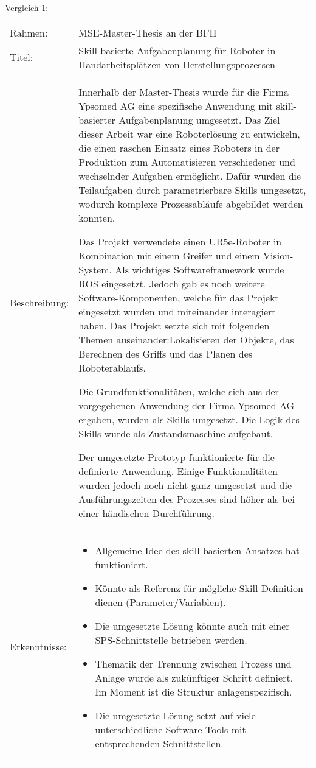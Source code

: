 	Vergleich  1:
	\vspace{2mm}
	\\
	\begin{tabularx}{\textwidth}{@{}>{}p{8em} X@{}}
		Rahmen: & 
		MSE-Master-Thesis an der BFH
		\\
		
		Titel: & 
		Skill-basierte Aufgabenplanung für Roboter in Handarbeitsplätzen von Herstellungsprozessen \cite{Vergleich_1} 
		\\
		
		Beschreibung: & 
		Innerhalb der Master-Thesis wurde für die Firma Ypsomed AG eine spezifische Anwendung mit skill-basierter Aufgabenplanung umgesetzt. Das Ziel dieser Arbeit war eine Roboterlösung zu entwickeln, die einen raschen Einsatz eines Roboters in der Produktion zum Automatisieren verschiedener und wechselnder Aufgaben ermöglicht. Dafür wurden die Teilaufgaben durch parametrierbare Skills umgesetzt, wodurch komplexe Prozessabläufe abgebildet werden konnten.
		
		Das Projekt verwendete einen UR5e-Roboter in Kombination mit einem Greifer und einem Vision-System. Als wichtiges Softwareframework wurde \Gls{ROS} eingesetzt. Jedoch gab es noch weitere Software-Komponenten, welche für das Projekt eingesetzt wurden und miteinander interagiert haben. Das Projekt setzte sich mit folgenden Themen auseinander:Lokalisieren der Objekte, das Berechnen des Griffs und das Planen des Roboterablaufs.
		
		Die Grundfunktionalitäten, welche sich aus der vorgegebenen Anwendung der Firma Ypsomed AG ergaben, wurden als Skills umgesetzt. Die Logik des Skills wurde als Zustandsmaschine aufgebaut. 
		
		Der umgesetzte Prototyp funktionierte für die definierte Anwendung. Einige Funktionalitäten wurden jedoch noch nicht ganz umgesetzt und die Ausführungszeiten des Prozesses sind höher als bei einer händischen Durchführung. 
		\\
		
		Erkenntnisse: & 
		\begin{itemize}
			\item Allgemeine Idee des skill-basierten Ansatzes hat funktioniert.
			\item Könnte als Referenz für mögliche Skill-Definition dienen (Parameter/Variablen).
			\item Die umgesetzte Lösung könnte auch mit einer \Gls{SPS}-Schnittstelle betrieben werden.
			\item Thematik der Trennung zwischen Prozess und Anlage wurde als zukünftiger Schritt definiert. Im Moment ist die Struktur anlagenspezifisch.
			\item Die umgesetzte Lösung setzt auf viele unterschiedliche Software-Tools mit entsprechenden Schnittstellen.
		\end{itemize}
	\end{tabularx}
	
